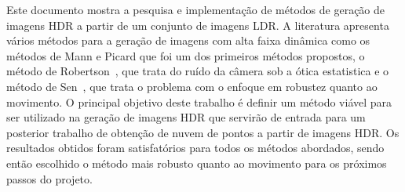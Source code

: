 Este documento mostra a pesquisa e implementação de métodos de geração de imagens HDR a partir de um conjunto de imagens LDR. A literatura apresenta vários métodos para a geração de imagens com alta faixa dinâmica como os métodos de Mann e Picard que foi um dos primeiros métodos propostos, o método de Robertson~\etal, que trata do ruído da câmera sob a ótica estatistica e o método de Sen~\etal, que trata o problema com o enfoque em robustez quanto ao movimento. O principal objetivo deste trabalho é definir um método viável para ser utilizado na geração de imagens HDR que servirão de entrada para um posterior trabalho de obtenção de nuvem de pontos a partir de imagens HDR. Os resultados obtidos foram satisfatórios para todos os métodos abordados, sendo então escolhido o método mais robusto quanto ao movimento para os próximos passos do projeto.